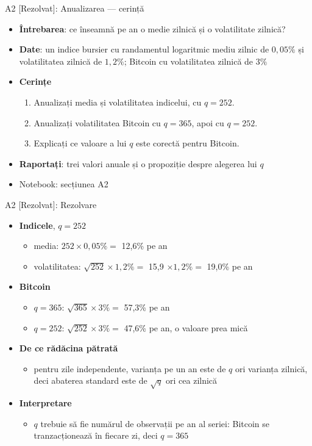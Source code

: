 \begin{frame}{A2 [Rezolvat]: Anualizarea --- cerință}
\itemsize{\small}
\begin{itemize}
\item \textbf{Întrebarea}: ce înseamnă pe an o medie zilnică și o volatilitate zilnică?
\item \textbf{Date}: un indice bursier cu randamentul logaritmic mediu zilnic de $0{,}05\%$ și volatilitatea zilnică de $1{,}2\%$; Bitcoin cu volatilitatea zilnică de $3\%$
\item \textbf{Cerințe}
\begin{enumerate}
    \item Anualizați media și volatilitatea indicelui, cu $q = 252$.
    \item Anualizați volatilitatea Bitcoin cu $q = 365$, apoi cu $q = 252$.
    \item Explicați ce valoare a lui $q$ este corectă pentru Bitcoin.
\end{enumerate}
\item \textbf{Raportați}: trei valori anuale și o propoziție despre alegerea lui $q$
\item Notebook: secțiunea A2
\end{itemize}
\end{frame}

\begin{frame}{A2 [Rezolvat]: Rezolvare}
\itemsize{\small}
\begin{itemize}
    \item \textbf{Indicele}, $q = 252$
    \begin{itemize}
        \item media: $252 \times 0{,}05\% = $ 12{,}6\% pe an
        \item volatilitatea: $\sqrt{252} \times 1{,}2\% = $ 15{,}9 $\times 1{,}2\% = $ 19{,}0\% pe an
    \end{itemize}
    \item \textbf{Bitcoin}
    \begin{itemize}
        \item $q = 365$: $\sqrt{365} \times 3\% = $ 57{,}3\% pe an
        \item $q = 252$: $\sqrt{252} \times 3\% = $ 47{,}6\% pe an, o valoare prea mică
    \end{itemize}
    \item \textbf{De ce rădăcina pătrată}
    \begin{itemize}
        \item pentru zile independente, varianța pe un an este de $q$ ori varianța zilnică, deci abaterea standard este de $\sqrt{q}$ ori cea zilnică
    \end{itemize}
    \item \textbf{Interpretare}
    \begin{itemize}
        \item $q$ trebuie să fie numărul de observații pe an al seriei: Bitcoin se tranzacționează în fiecare zi, deci $q = 365$
    \end{itemize}
\end{itemize}
\end{frame}

